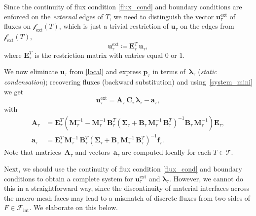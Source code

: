 \documentclass[12pt]{article}
\newcommand{\vect}[1]{\boldsymbol{\mathbf{#1}}}
\newcommand{\bmesh}{{\vect{\mathcal T}}}
\newcommand{\mmesh}{{\vect{\mathcal \tau}}}
\newcommand{\bfaces}[1][]{{\vect{\mathcal F}_{\text{#1}}}}
\newcommand{\mfaces}[1][]{{\vect{\mathcal f}_{\text{#1}}}}
\begin{document}
	Since the continuity of flux condition \eqref{flux_cond} and boundary conditions are enforced on  the \emph{external} edges of $T$, {\color{blue}we need to distinguish the vector} ${\vect u}^\text{ext}_\mmesh$ of fluxes on $\mfaces[ext](T)$, which is just a trivial restriction of ${\vect u}_\mmesh$ on the edges  from $\mfaces[ext](T)$,
	\begin{equation}\label{system_mini}
		{\vect u}^\text{ext}_\mmesh \coloneqq \vect E_\mmesh^T\,{\vect u}_\mmesh,
	\end{equation}
	where $\vect E_\mmesh^T$ is the restriction matrix with entries equal $0$ or $1$.
	
	We now eliminate ${\vect u}_\mmesh$ from \eqref{local} and express ${\vect p}_\mmesh$ in terms of~${\vect \lambda}_\mmesh$ (\textit{static condensation}); recovering fluxes (backward substitution) and using~\eqref{system_mini} we get
	\begin{equation}\label{mini_flux_dofs}
		{\vect u}^\text{ext}_\mmesh = \vect A_\mmesh\,\vect C_\mmesh\,{\vect \lambda}_\mmesh - {\vect a}_\mmesh,
	\end{equation}
	with
	\begin{align} \label{defA}
		\vect A_\mmesh &= \vect E^T_\mmesh \left( \vect M^{-1}_\mmesh - \vect M^{-1}_\mmesh\,\vect B^T_\mmesh \left( \vect \Sigma_\mmesh + \vect B_\mmesh\,\vect M^{-1}_\mmesh\,\vect B^{T}_\mmesh\right)^{-1} \vect B_\mmesh\,\vect M^{-1}_\mmesh \right) \vect E_\mmesh, \\
		{\vect a}_\mmesh &= \vect E^{T}_\mmesh\,\vect M^{-1}_\mmesh\,\vect B^T_\mmesh \left( \vect \Sigma_\mmesh + \vect B_\mmesh\,\vect M^{-1}_\mmesh\,\vect B^{T}_\mmesh\right)^{-1} {\vect f}_\mmesh.
	\end{align}
	Note that matrices~$\vect A_\mmesh$ and vectors~${\vect a}_\mmesh$ are computed locally for each $T\in\bmesh$.
	\smallskip
	
	Next, we should use the continuity of flux condition \eqref{flux_cond} and boundary conditions to obtain a complete system for ${\vect u}^\text{ext}_\mmesh$ and ${\vect \lambda}_\mmesh$. However, we cannot do this in a straightforward way, since the discontinuity of material interfaces across the macro-mesh faces may lead to a mismatch of discrete fluxes from two sides of $F\in\bfaces[int]$. {\color{blue}We elaborate on this below.}
	
\end{document}
